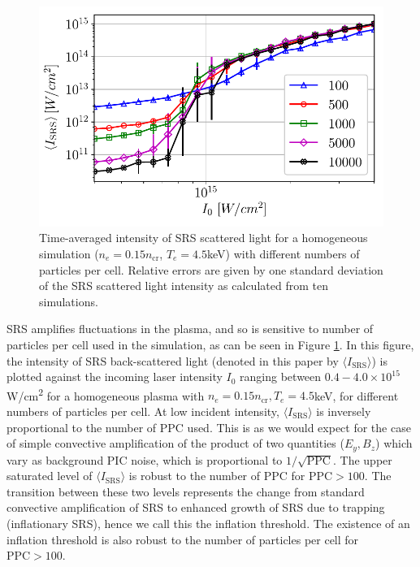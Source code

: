 \begin{figure}[ht]
 \centering
 \includegraphics[width=0.8\columnwidth]{Chapters/C4_iSRS/fig1.pdf}
 \caption{Time-averaged intensity of SRS scattered light for a homogeneous simulation ($n_e=0.15n_\mathrm{cr}$, $T_e = 4.5$\si{\kilo \electronvolt}) with different numbers of particles
 per cell. Relative errors are given by one standard deviation of the SRS scattered light intensity as calculated from ten simulations.} \label{fig:convergence}
\end{figure}

SRS amplifies fluctuations in the plasma, and so is sensitive to number of particles per cell used in the simulation, as can be seen in Figure \ref{fig:convergence}.
In this figure, the intensity of SRS back-scattered light (denoted in this paper by $\langle I_{\mathrm{SRS}}\rangle$) is plotted against the incoming laser intensity $I_0$ ranging between
$0.4 - 4.0 \times 10^{15}$\si{W/\centi\metre^2} for a homogeneous plasma with $n_e=0.15n_\mathrm{cr}, T_e = 4.5$\si{\kilo \electronvolt}, for different numbers of
particles per cell.
At low incident intensity, $\langle I_{\mathrm{SRS}}\rangle$ is inversely proportional to the number of PPC used. This is as we
would expect for the case of simple convective amplification \citep{Rosenbluth1972} of the product of two quantities ($E_y,B_z$) which vary as background PIC noise, which is proportional to $1/\sqrt{\mathrm{PPC}}$.
The upper saturated level of  $\langle I_{\mathrm{SRS}}\rangle$ is robust to the number of PPC for $\mathrm{PPC} > 100$.
The transition between these two levels represents the change from standard convective amplification of SRS to enhanced
growth of SRS due to trapping (inflationary SRS), hence we call this the inflation threshold.
The existence of an inflation threshold is also robust to the number of particles per cell for $\mathrm{PPC} > 100$.

